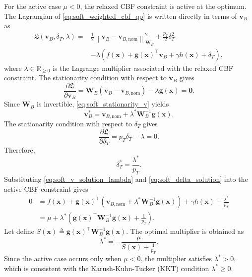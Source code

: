 \documentclass[journal]{IEEEtran}
\newcommand{\R}{\mathbb{R}}
\begin{document}
For the active case $\mu<0$, the relaxed CBF constraint is active at the optimum. The Lagrangian of \eqref{eq:soft_weighted_cbf_qp} is written directly in terms of $\bm{v}_{B}$ as
\begin{align}
  \mathfrak{L}(\bm{v}_{B},\delta_T,\lambda)
  =&
  \frac{1}{2}
  \left\|
  \bm{v}_{B}-\bm{v}_{B,\mathrm{nom}}
  \right\|_{\bm{W}_{B}}^{2}
  +
  \frac{p_T}{2}\delta_T^{2} \nonumber\\
  &-
  \lambda
  \left(
  f(\bm{x})+\bm{g}(\bm{x})^{\top}\bm{v}_{B}
  +\gamma h(\bm{x})+\delta_T
  \right),
  \label{eq:soft_lagrangian}
\end{align}
where $\lambda\in\R_{\ge0}$ is the Lagrange multiplier associated with the relaxed CBF constraint. The stationarity condition with respect to $\bm{v}_{B}$ gives
\begin{equation}
  \frac{\partial\mathfrak{L}}{\partial \bm{v}_{B}}
  =
  \bm{W}_{B}\left(\bm{v}_{B}-\bm{v}_{B,\mathrm{nom}}\right)
  -
  \lambda\bm{g}(\bm{x})
  =
  \bm{0}.
  \label{eq:soft_stationarity_v}
\end{equation}
Since $\bm{W}_{B}$ is invertible, \eqref{eq:soft_stationarity_v} yields
\begin{equation}
  \bm{v}_{B}^{*}
  =
  \bm{v}_{B,\mathrm{nom}}
  +
  \lambda^{*}\bm{W}_{B}^{-1}\bm{g}(\bm{x}).
  \label{eq:soft_v_solution_lambda}
\end{equation}
The stationarity condition with respect to $\delta_T$ gives
\begin{equation}
  \frac{\partial\mathfrak{L}}{\partial \delta_T}
  =
  p_T\delta_T-\lambda
  =
  0.
  \label{eq:soft_stationarity_delta}
\end{equation}
Therefore,
\begin{equation}
  \delta_T^{*}
  =
  \frac{\lambda^{*}}{p_T}.
  \label{eq:soft_delta_solution}
\end{equation}
Substituting \eqref{eq:soft_v_solution_lambda} and \eqref{eq:soft_delta_solution} into the active CBF constraint gives
\begin{align}
  0
  &=
  f(\bm{x})
  +
  \bm{g}(\bm{x})^{\top}
  \left(
  \bm{v}_{B,\mathrm{nom}}
  +
  \lambda^{*}\bm{W}_{B}^{-1}\bm{g}(\bm{x})
  \right)
  +
  \gamma h(\bm{x})
  +
  \frac{\lambda^{*}}{p_T} \nonumber\\
  &=
  \mu
  +
  \lambda^{*}
  \left(
  \bm{g}(\bm{x})^{\top}\bm{W}_{B}^{-1}\bm{g}(\bm{x})
  +
  \frac{1}{p_T}
  \right).
  \label{eq:soft_lambda_substitution}
\end{align}
Let define $S(\bm{x}) \triangleq \bm{g}(\bm{x})^{\top}\bm{W}_{B}^{-1}\bm{g}(\bm{x})$. The optimal multiplier is obtained as
\begin{equation}
  \lambda^{*}
  =
  -
  \frac{\mu}
  {S(\bm{x})+\frac{1}{p_T}}.
  \label{eq:soft_lambda_solution}
\end{equation}
Since the active case occurs only when $\mu<0$, the multiplier satisfies $\lambda^{*}>0$, which is consistent with the Karush-Kuhn-Tucker (KKT) condition $\lambda^{*}\ge0$.
\end{document}
